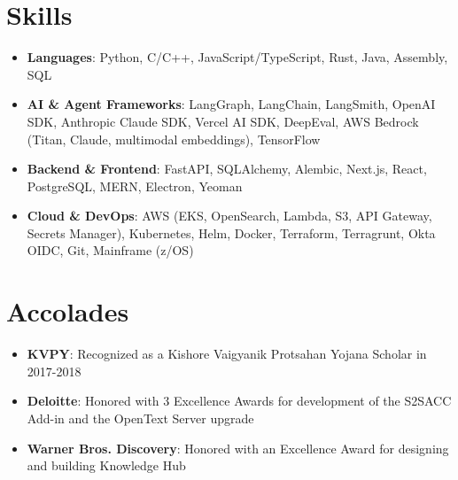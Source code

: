 \documentclass[letterpaper,10pt]{article}
\newcommand{\resumeSubItem}[2]{
  \item\small{
    \textbf{#1}{: #2}
  }\vspace{-2pt}
}
\newcommand{\resumeSubHeadingListStart}{\begin{itemize}[leftmargin=*]}
\newcommand{\resumeSubHeadingListEnd}{\end{itemize}}
\begin{document}
\section{Skills}
    \resumeSubHeadingListStart
        \resumeSubItem
            {Languages} {Python, C/C++, JavaScript/TypeScript, Rust, Java, Assembly, SQL}
        \resumeSubItem
            {AI \& Agent Frameworks} {LangGraph, LangChain, LangSmith, OpenAI SDK, Anthropic Claude SDK, Vercel AI SDK, DeepEval, AWS Bedrock (Titan, Claude, multimodal embeddings), TensorFlow}
        \resumeSubItem
            {Backend \& Frontend} {FastAPI, SQLAlchemy, Alembic, Next.js, React, PostgreSQL, MERN, Electron, Yeoman}
        \resumeSubItem
            {Cloud \& DevOps} {AWS (EKS, OpenSearch, Lambda, S3, API Gateway, Secrets Manager), Kubernetes, Helm, Docker, Terraform, Terragrunt, Okta OIDC, Git, Mainframe (z/OS)}
 \resumeSubHeadingListEnd

 \section{Accolades}
  \resumeSubHeadingListStart
      \resumeSubItem{KVPY}
      {Recognized as a Kishore Vaigyanik Protsahan Yojana Scholar in 2017-2018}
    \resumeSubItem{Deloitte}
      {Honored with 3 Excellence Awards for development of the S2SACC Add-in and the OpenText Server upgrade}
    \resumeSubItem{Warner Bros. Discovery}
      {Honored with an Excellence Award for designing and building Knowledge Hub}
  \resumeSubHeadingListEnd
\end{document}
